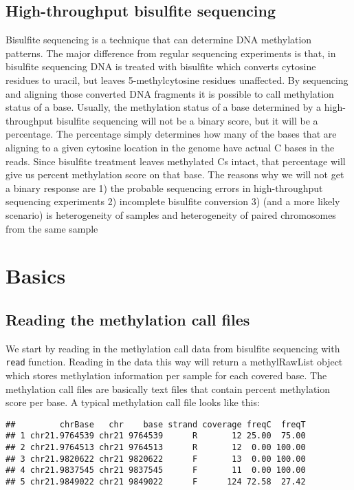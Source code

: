 \documentclass{article}
\makeatletter
\newenvironment{kframe}{%
 \def\FrameCommand##1{\hskip\@totalleftmargin \hskip-\fboxsep
 \colorbox{shadecolor}{##1}\hskip-\fboxsep
     \hskip-\linewidth \hskip-\@totalleftmargin \hskip\columnwidth}%
 \MakeFramed {\advance\hsize-\width
   \@totalleftmargin\z@ \linewidth\hsize
   \@setminipage}}%
 {\par\unskip\endMakeFramed}
\newenvironment{knitrout}{}{} %
\makeatother
\begin{document}
\subsection{High-throughput bisulfite sequencing}
Bisulfite sequencing is a technique that can determine DNA methylation patterns. The major difference from regular sequencing experiments is that, in bisulfite sequencing DNA is treated with bisulfite which converts cytosine residues to uracil, but leaves 5-methylcytosine residues unaffected. By sequencing and aligning those converted DNA fragments it is possible to call methylation status of a base. Usually, the methylation status of a base determined by a high-throughput bisulfite sequencing will not be a binary score, but it will be a percentage. The percentage simply determines how many of the bases that are aligning to a given cytosine location in the genome have actual C bases in the reads. Since bisulfite treatment leaves methylated Cs intact, that percentage will give us percent methylation score on that base. The reasons why we will not get a binary response are 1) the probable sequencing errors in high-throughput sequencing experiments 2) incomplete bisulfite conversion 3) (and a more likely scenario) is heterogeneity of samples and heterogeneity of paired chromosomes from the same sample 




\section{Basics}
\subsection{Reading the methylation call files}
We start by reading in the methylation call data from bisulfite
sequencing with \texttt{read} function. Reading in the data this way
will return a methylRawList object which stores methylation
information per sample for each covered base. The methylation call files are basically text
files that contain percent methylation score per base. A typical methylation call file looks like this:
\begin{knitrout}
\color{fgcolor}\begin{kframe}
\begin{verbatim}
##         chrBase   chr    base strand coverage freqC  freqT
## 1 chr21.9764539 chr21 9764539      R       12 25.00  75.00
## 2 chr21.9764513 chr21 9764513      R       12  0.00 100.00
## 3 chr21.9820622 chr21 9820622      F       13  0.00 100.00
## 4 chr21.9837545 chr21 9837545      F       11  0.00 100.00
## 5 chr21.9849022 chr21 9849022      F      124 72.58  27.42
\end{verbatim}
\end{kframe}
\end{knitrout}
\end{document}
